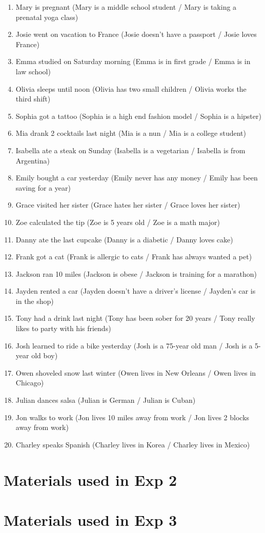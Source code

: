 \documentclass[11pt,fleqn]{article}
\newcommand{\6}{\mbox{$[\hspace*{-.6mm}[$}}
\newcommand{\9}{\mbox{$]\hspace*{-.6mm}]$}}
\begin{document}
\begin{enumerate}[leftmargin=3ex,itemsep=-2pt]
\item Mary is pregnant (Mary is a middle school student / Mary is taking a prenatal yoga class)
\item Josie went on vacation to France (Josie doesn't have a passport / Josie loves France)
\item Emma studied on Saturday morning (Emma is in first grade / Emma is in law school)
\item Olivia sleeps until noon (Olivia has two small children / Olivia works the third shift)
\item Sophia got a tattoo (Sophia is a high end fashion model / Sophia is a hipster)
\item Mia drank 2 cocktails last night (Mia is a nun / Mia is a college student)
\item Isabella ate a steak on Sunday (Isabella is a vegetarian / Isabella is from Argentina)
\item  Emily bought a car yesterday (Emily never has any money / Emily has been saving for a year)
\item  Grace visited her sister (Grace hates her sister / Grace loves her sister)
\item Zoe calculated the tip (Zoe is 5 years old / Zoe is a math major)
\item  Danny ate the last cupcake (Danny is a diabetic / Danny loves cake)
\item  Frank got a cat (Frank is allergic to cats / Frank has always wanted a pet)
\item  Jackson ran 10 miles (Jackson is obese / Jackson is training for a marathon)
\item  Jayden rented a car (Jayden doesn't have a driver's license / Jayden's car is in the shop)
\item  Tony had a drink last night (Tony has been sober for 20 years / Tony really likes to party with his friends)
\item  Josh learned to ride a bike yesterday (Josh is a 75-year old man / Josh is a 5-year old boy)
\item  Owen shoveled snow last winter (Owen lives in New Orleans / Owen lives in Chicago)
\item  Julian dances salsa (Julian is German / Julian is Cuban)
\item  Jon walks to work (Jon lives 10 miles away from work / Jon lives 2 blocks away from work)
\item  Charley speaks Spanish (Charley lives in Korea / Charley lives in Mexico)
\end{enumerate}

\clearpage

\section{Materials used in Exp 2}\label{a-exp2}

\section{Materials used in Exp 3}\label{a-exp3}



\end{document}
